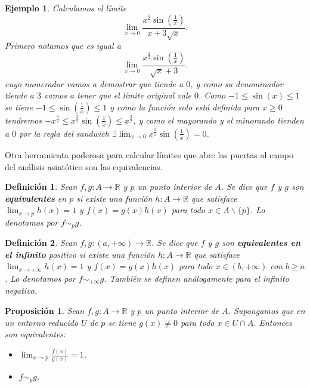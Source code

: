 \documentclass{article}
\newtheorem{prop}{Proposición}
\newtheorem{define}{Definición}
\newtheorem{ejem}{Ejemplo}
\newcommand{\reales}{\mathbb{R}}
\begin{document}
\begin{ejem}
	Calculamos el límite
	\begin{equation*}
		\lim_{x\rightarrow 0} \frac{x^2 \sin(\frac{1}{x})}{x + 3\sqrt{x}}.
	\end{equation*}
	Primero notamos que es igual a 
	\begin{equation*}
		\lim_{x\rightarrow 0} \frac{x^{\frac{3}{2}} \sin(\frac{1}{x})}{\sqrt{x} + 3}.
	\end{equation*}
	cuyo numerador vamos a demostrar que tiende a $0$, y como su denominador tiende a $3$ vamos a tener que el límite original vale $0$.
	Como $-1 \leq \sin(x) \leq 1$ se tiene $-1 \leq \sin(\frac{1}{x}) \leq 1$ y como la función solo está definida para $x \geq 0$ tendremos $-x^{\frac{3}{2}} \leq x^{\frac{3}{2}}\sin(\frac{1}{x}) \leq x^{\frac{3}{2}}$, y como el mayorando y el minorando tienden a $0$ por la regla del sandwich $\exists \lim_{x\rightarrow 0}x^{\frac{3}{2}}\sin(\frac{1}{x}) = 0$.
\end{ejem}

Otra herramienta poderosa para calcular límites que abre las puertas al campo del análisis asintótico son las equivalencias.

\begin{define}
	Sean $f,g: A \rightarrow \reales$ y $p$ un punto interior de $A$. Se dice que $f$ y $g$ son \textbf{equivalentes} en $p$ si existe una función $h:A \rightarrow \reales$ que satisface $\lim_{x \rightarrow p} h(x) = 1$ y $f(x) = g(x)h(x)$ para todo $x \in A \smallsetminus \{p \}$. Lo denotamos por $f \sim_p g$.
\end{define}

\begin{define}
	Sean $f,g: (a, +\infty) \rightarrow \reales$. Se dice que $f$ y $g$ son \textbf{equivalentes en el infinito} positivo si existe una función $h:A \rightarrow \reales$ que satisface $\lim_{x \rightarrow +\infty} h(x) = 1$ y $f(x) = g(x)h(x)$ para todo $x \in (b, +\infty)$ con $b \geq a$. Lo denotamos por $f \sim_{+\infty} g$. También se definen análogamente para el infinito negativo.
\end{define}

\begin{prop}\label{prop_equivalencia}
	Sean $f,g: A \rightarrow \reales$ y $p$ un punto interior de $A$. Supongamos que en un entorno reducido $U$ de $p$ se tiene $g(x) \neq 0$ para todo $x \in U \cap A$. Entonces son equivalentes:
	\begin{itemize}
		\item
		$\lim_{x\rightarrow p} \frac{f(x)}{g(x)} = 1$.
		\item
		$f \sim_p g$.
	\end{itemize}
\end{prop}
\end{document}
